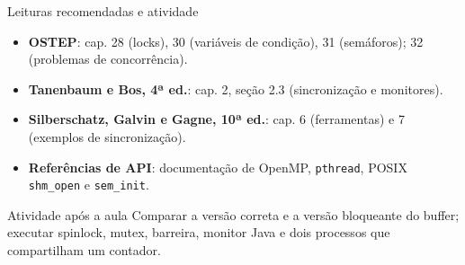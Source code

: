 \documentclass[aspectratio=169,11pt]{beamer}
\begin{document}
\begin{frame}{Leituras recomendadas e atividade}
\small
\begin{itemize}
\item \textbf{OSTEP}: cap. 28 (locks), 30 (variáveis de condição), 31 (semáforos); 32 (problemas de concorrência).
\item \textbf{Tanenbaum e Bos, 4ª ed.}: cap. 2, seção 2.3 (sincronização e monitores).
\item \textbf{Silberschatz, Galvin e Gagne, 10ª ed.}: cap. 6 (ferramentas) e 7 (exemplos de sincronização).
\item \textbf{Referências de API}: documentação de OpenMP, \texttt{pthread}, POSIX \texttt{shm\_open} e \texttt{sem\_init}.
\end{itemize}
\begin{block}{Atividade após a aula}
Comparar a versão correta e a versão bloqueante do buffer; executar spinlock, mutex, barreira, monitor Java e dois processos que compartilham um contador.
\end{block}
\end{frame}
\end{document}
